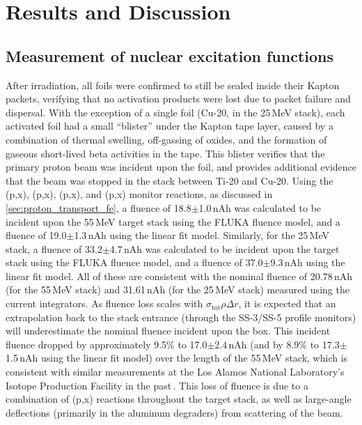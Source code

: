 \section{\label{sec:results_fe}Results and Discussion}


\subsection{Measurement of nuclear excitation functions}

After irradiation, all foils were confirmed to still be sealed inside their Kapton packets, verifying that no activation products were lost due to packet failure and dispersal.
With the exception of a single foil (Cu-20, in the 25\,MeV stack), each activated foil had a small \enquote{blister} under the Kapton tape layer, caused by a combination of thermal swelling, off-gassing of oxides, and the formation of gaseous short-lived beta activities in the tape.
This blister   verifies that the primary proton beam was incident upon the foil, and provides additional 
evidence 
that the beam was stopped in the stack between Ti-20 and Cu-20.
Using the (p,x), (p,x), (p,x), and (p,x) monitor reactions, as discussed in \autoref{sec:proton_transport_fe}, a fluence of 18.8$\pm$1.0\,nAh was calculated to be incident upon the 55\,MeV target stack using the FLUKA fluence model, and a  fluence of 19.0$\pm$1.3\,nAh using the linear fit model.
Similarly, for the 25\,MeV stack, a fluence of 33.2$\pm$4.7\,nAh was calculated to be incident upon the 
target stack using the FLUKA fluence model, and a  fluence of 37.0$\pm$9.3\,nAh using the linear fit model.
All of these are consistent with the nominal fluence of 20.78\,nAh (for the 55\,MeV stack) and 31.61\,nAh (for the 25\,MeV stack) measured using the 
current integrators.
As fluence loss scales with $\sigma_{\mathrm{tot}}\rho\Delta r$, it is expected that an extrapolation back to the stack entrance (through the SS-3/SS-5 profile monitors) will underestimate the nominal fluence incident upon the box.
This incident fluence dropped by approximately 9.5\% to  17.0$\pm$2.4\,nAh (and by 8.9\% to  17.3$\pm$1.5\,nAh using the linear fit model) over the length of the 55\,MeV stack, which is consistent with similar measurements at the Los Alamos National Laboratory's Isotope Production Facility in the past\,\cite{Voyles2018a,Graves2016}.
This loss of fluence is due to a combination of 
(p,x) reactions throughout the target stack, as well as large-angle deflections (primarily in the aluminum degraders) from scattering of the beam.




